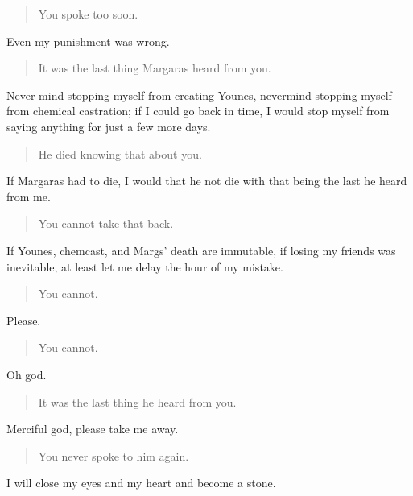 \begin{quote}
You spoke too soon.
\end{quote}

Even my punishment was wrong.

\begin{quote}
It was the last thing Margaras heard from you.
\end{quote}

Never mind stopping myself from creating Younes, nevermind stopping myself from chemical castration; if I could go back in time, I would stop myself from saying anything for just a few more days.

\begin{quote}
He died knowing that about you.
\end{quote}

If Margaras had to die, I would that he not die with that being the last he heard from me.

\begin{quote}
You cannot take that back.
\end{quote}

If Younes, chemcast, and Margs' death are immutable, if losing my friends was inevitable, at least let me delay the hour of my mistake.

\begin{quote}
You cannot.
\end{quote}

Please.

\begin{quote}
You cannot.
\end{quote}

Oh god.

\begin{quote}
It was the last thing he heard from you.
\end{quote}

Merciful god, please take me away.

\begin{quote}
You never spoke to him again.
\end{quote}

I will close my eyes and my heart and become a stone.
